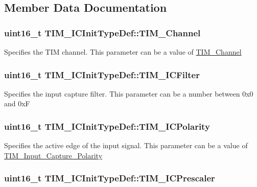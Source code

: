 \subsection{Member Data Documentation}
\hypertarget{structTIM__ICInitTypeDef_ab9404ee3d95aaa7a478ed99562c736d2}{
\subsubsection[{TIM\_\-Channel}]{\setlength{\rightskip}{0pt plus 5cm}uint16\_\-t {\bf TIM\_\-ICInitTypeDef::TIM\_\-Channel}}}
\label{structTIM__ICInitTypeDef_ab9404ee3d95aaa7a478ed99562c736d2}
Specifies the TIM channel. This parameter can be a value of \hyperlink{group__TIM__Channel}{TIM\_\-Channel} \hypertarget{structTIM__ICInitTypeDef_a72539caa6e965e4fa89e3b21b188cf26}{
\subsubsection[{TIM\_\-ICFilter}]{\setlength{\rightskip}{0pt plus 5cm}uint16\_\-t {\bf TIM\_\-ICInitTypeDef::TIM\_\-ICFilter}}}
\label{structTIM__ICInitTypeDef_a72539caa6e965e4fa89e3b21b188cf26}
Specifies the input capture filter. This parameter can be a number between 0x0 and 0xF \hypertarget{structTIM__ICInitTypeDef_a234c284efc36c0cc15a2ed0fb4435557}{
\subsubsection[{TIM\_\-ICPolarity}]{\setlength{\rightskip}{0pt plus 5cm}uint16\_\-t {\bf TIM\_\-ICInitTypeDef::TIM\_\-ICPolarity}}}
\label{structTIM__ICInitTypeDef_a234c284efc36c0cc15a2ed0fb4435557}
Specifies the active edge of the input signal. This parameter can be a value of \hyperlink{group__TIM__Input__Capture__Polarity}{TIM\_\-Input\_\-Capture\_\-Polarity} \hypertarget{structTIM__ICInitTypeDef_ac61c7fc999ace295ac81b304cabd61e0}{
\subsubsection[{TIM\_\-ICPrescaler}]{\setlength{\rightskip}{0pt plus 5cm}uint16\_\-t {\bf TIM\_\-ICInitTypeDef::TIM\_\-ICPrescaler}}}
